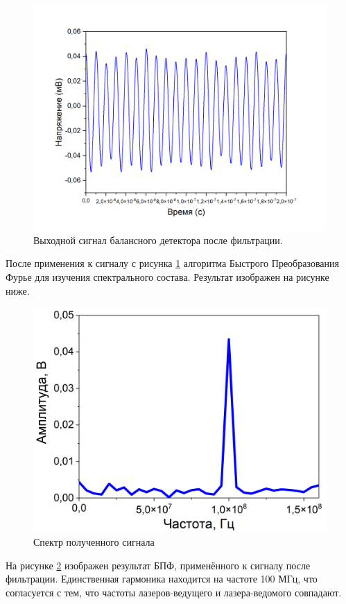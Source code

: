 \begin{figure}
    \centering
    \includegraphics[width=\linewidth]{images/фильтрованное с новыми шкалами.png}
    \caption{Выходной сигнал балансного детектора после фильтрации.}
    \label{fig:filter 100 mhz ch2}
\end{figure}
После применения к сигналу с рисунка \ref{fig:filter 100 mhz ch2} алгоритма Быстрого Преобразования Фурье для изучения спектрального состава. Результат изображен на рисунке ниже.
\begin{figure}
    \centering
    \includegraphics[width=0.7\linewidth]{images/05.png}
    \caption{Спектр полученного сигнала}
    \label{fig:spectrum ch2}
\end{figure}
На рисунке \ref{fig:spectrum ch2} изображен результат БПФ, применённого к сигналу после фильтрации. Единственная гармоника находится на частоте 100 МГц, что согласуется с тем, что частоты лазеров-ведущего и лазера-ведомого совпадают.
